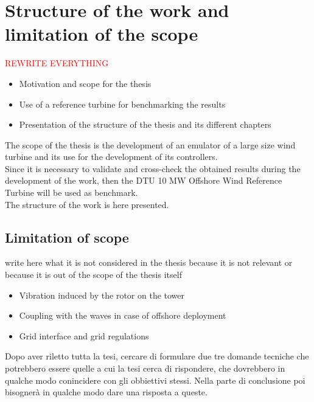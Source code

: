 \newpage
\section{Structure of the work and limitation of the scope}

\textcolor{red}{REWRITE EVERYTHING}
\begin{itemize}
    \item Motivation and scope for the thesis
    \item Use of a reference turbine for benchmarking the results
    \item Presentation of the structure of the thesis and its different chapters
\end{itemize}


The scope of the thesis is the development of an emulator of a large size wind turbine and its use for the development of its controllers.\\

Since it is necessary to validate and cross-check the obtained results during the development of the work, then the DTU 10 MW Offshore Wind Reference Turbine will be used as benchmark.\\

The structure of the work is here presented.\\

\subsection{Limitation of scope}\label{sec:limitation_of_scope}
write here what it is not considered in the thesis because it is not relevant or because it is out of the scope of the thesis itself
\begin{itemize}
    \item Vibration induced by the rotor on the tower
    \item Coupling with the waves in case of offshore deployment
    \item Grid interface and grid regulations
\end{itemize}

Dopo aver riletto tutta la tesi, cercare di formulare due tre domande tecniche che potrebbero essere quelle a cui la tesi cerca di rispondere, che dovrebbero in qualche modo conincidere con gli obbiettivi stessi. Nella parte di conclusione poi bisognerà in qualche modo dare una risposta a queste.
